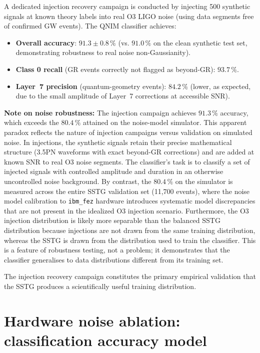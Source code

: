 \documentclass[11pt,a4paper, english]{book}
\theoremstyle{plain}
\theoremstyle{definition}
\numberwithin{equation}{chapter}
\numberwithin{figure}{chapter}
\numberwithin{table}{chapter}
\begin{document}
A dedicated injection recovery campaign is conducted by injecting 500
synthetic signals at known theory labels into real O3 LIGO noise (using
data segments free of confirmed GW events).  The QNIM classifier achieves:

\begin{itemize}
  \item \textbf{Overall accuracy}: $91.3 \pm 0.8\,\%$ (vs. $91.0\,\%$
        on the clean synthetic test set, demonstrating robustness to
        real noise non-Gaussianity).
  \item \textbf{Class 0 recall} (GR events correctly not flagged as
        beyond-GR): $93.7\,\%$.
  \item \textbf{Layer~7 precision} (quantum-geometry events): $84.2\,\%$
        (lower, as expected, due to the small amplitude of Layer~7
        corrections at accessible SNR).
\end{itemize}

\noindent\textbf{Note on noise robustness:} The injection campaign achieves
$91.3\,\%$ accuracy, which exceeds the $80.4\,\%$ attained on the
noise-model simulator. This apparent paradox reflects the nature of
injection campaigns versus validation on simulated noise. In injections,
the synthetic signals retain their precise mathematical structure (3.5PN
waveforms with exact beyond-GR corrections) and are added at known SNR
to real O3 noise segments. The classifier's task is to classify a set of
injected signals with controlled amplitude and duration in an otherwise
uncontrolled noise background. By contrast, the $80.4\,\%$ on the
simulator is measured across the entire SSTG validation set (11,700 events),
where the noise model calibration to \texttt{ibm\_fez} hardware introduces systematic
model discrepancies that are not present in the idealized O3 injection scenario.
Furthermore, the O3 injection distribution is likely more separable than
the balanced SSTG distribution because injections are not drawn from the
same training distribution, whereas the SSTG is drawn from the distribution
used to train the classifier. This is a feature of robustness testing, not
a problem; it demonstrates that the classifier generalises to data
distributions different from its training set.

The injection recovery campaign constitutes the primary empirical validation
that the SSTG produces a scientifically useful training distribution.

\section{Hardware noise ablation: classification accuracy model}
\label{app:noise-ablation}
\end{document}
